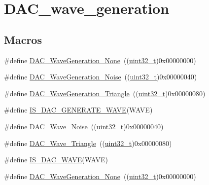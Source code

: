 \hypertarget{group___d_a_c__wave__generation}{}\section{D\+A\+C\+\_\+wave\+\_\+generation}
\label{group___d_a_c__wave__generation}
\subsection*{Macros}
\begin{DoxyCompactItemize}
\item 
\#define \hyperlink{group___d_a_c__wave__generation_gaabbcd575d6106267f6b65ce988158f29}{D\+A\+C\+\_\+\+Wave\+Generation\+\_\+\+None}~((\hyperlink{_p_e___types_8h_a33594304e786b158f3fb30289278f5af}{uint32\+\_\+t})0x00000000)
\item 
\#define \hyperlink{group___d_a_c__wave__generation_ga1692990325098cae6f32182c1fa0f61e}{D\+A\+C\+\_\+\+Wave\+Generation\+\_\+\+Noise}~((\hyperlink{_p_e___types_8h_a33594304e786b158f3fb30289278f5af}{uint32\+\_\+t})0x00000040)
\item 
\#define \hyperlink{group___d_a_c__wave__generation_ga68f1a71011437a5ea6298ab039554714}{D\+A\+C\+\_\+\+Wave\+Generation\+\_\+\+Triangle}~((\hyperlink{_p_e___types_8h_a33594304e786b158f3fb30289278f5af}{uint32\+\_\+t})0x00000080)
\item 
\#define \hyperlink{group___d_a_c__wave__generation_ga50fb2dd12305cd7bd0b738a1f6388d3c}{I\+S\+\_\+\+D\+A\+C\+\_\+\+G\+E\+N\+E\+R\+A\+T\+E\+\_\+\+W\+A\+VE}(W\+A\+VE)
\item 
\#define \hyperlink{group___d_a_c__wave__generation_ga09c5ee68f8e726b1c039df1f6e195965}{D\+A\+C\+\_\+\+Wave\+\_\+\+Noise}~((\hyperlink{_p_e___types_8h_a33594304e786b158f3fb30289278f5af}{uint32\+\_\+t})0x00000040)
\item 
\#define \hyperlink{group___d_a_c__wave__generation_ga95a1566e1728e1e345e8f3b50629a075}{D\+A\+C\+\_\+\+Wave\+\_\+\+Triangle}~((\hyperlink{_p_e___types_8h_a33594304e786b158f3fb30289278f5af}{uint32\+\_\+t})0x00000080)
\item 
\#define \hyperlink{group___d_a_c__wave__generation_ga45c25065fb713820f6dbae0009376e1c}{I\+S\+\_\+\+D\+A\+C\+\_\+\+W\+A\+VE}(W\+A\+VE)
\item 
\#define \hyperlink{group___d_a_c__wave__generation_gaabbcd575d6106267f6b65ce988158f29}{D\+A\+C\+\_\+\+Wave\+Generation\+\_\+\+None}~((\hyperlink{_p_e___types_8h_a33594304e786b158f3fb30289278f5af}{uint32\+\_\+t})0x00000000)

\end{DoxyCompactItemize}
